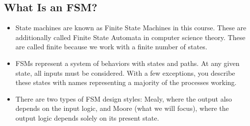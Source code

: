 \documentclass[10pt,a4paper]{article}
\begin{document}
\subsection{What Is an FSM?}
\begin{itemize}
\item State machines are known as Finite State Machines in this course. These are additionally called Finite State Automata in computer science theory. These are called finite because we work with a finite number of states.
\item FSMs represent a system of behaviors with states and paths. At any given state, all inputs must be considered. With a few exceptions, you describe these states with names representing a majority of the processes working.
\item There are two types of FSM design styles: Mealy, where the output also depends on the input logic, and Moore (what we will focus), where the output logic depends solely on its present state.
\end{itemize}
\end{document}
